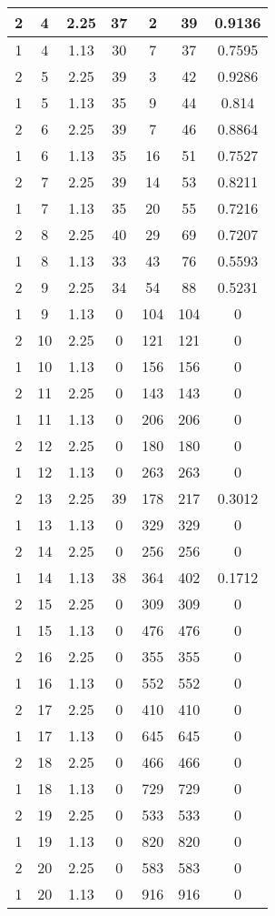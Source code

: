 \documentclass[letterpaper, 12pt]{article}
\begin{document}
\begin{longtable}{|c|c|c|c|c|c|c|}
\hline
2 & 4 & 2.25 & 37 & 2 & 39 & 0.9136 \\
\hline
1 & 4 & 1.13 & 30 & 7 & 37 & 0.7595 \\
\hline
2 & 5 & 2.25 & 39 & 3 & 42 & 0.9286 \\
\hline
1 & 5 & 1.13 & 35 & 9 & 44 & 0.814 \\
\hline
2 & 6 & 2.25 & 39 & 7 & 46 & 0.8864 \\
\hline
1 & 6 & 1.13 & 35 & 16 & 51 & 0.7527 \\
\hline
2 & 7 & 2.25 & 39 & 14 & 53 & 0.8211 \\
\hline
1 & 7 & 1.13 & 35 & 20 & 55 & 0.7216 \\
\hline
2 & 8 & 2.25 & 40 & 29 & 69 & 0.7207 \\
\hline
1 & 8 & 1.13 & 33 & 43 & 76 & 0.5593 \\
\hline
2 & 9 & 2.25 & 34 & 54 & 88 & 0.5231 \\
\hline
1 & 9 & 1.13 & 0 & 104 & 104 & 0 \\
\hline
2 & 10 & 2.25 & 0 & 121 & 121 & 0 \\
\hline
1 & 10 & 1.13 & 0 & 156 & 156 & 0 \\
\hline
2 & 11 & 2.25 & 0 & 143 & 143 & 0 \\
\hline
1 & 11 & 1.13 & 0 & 206 & 206 & 0 \\
\hline
2 & 12 & 2.25 & 0 & 180 & 180 & 0 \\
\hline
1 & 12 & 1.13 & 0 & 263 & 263 & 0 \\
\hline
2 & 13 & 2.25 & 39 & 178 & 217 & 0.3012 \\
\hline
1 & 13 & 1.13 & 0 & 329 & 329 & 0 \\
\hline
2 & 14 & 2.25 & 0 & 256 & 256 & 0 \\
\hline
1 & 14 & 1.13 & 38 & 364 & 402 & 0.1712 \\
\hline
2 & 15 & 2.25 & 0 & 309 & 309 & 0 \\
\hline
1 & 15 & 1.13 & 0 & 476 & 476 & 0 \\
\hline
2 & 16 & 2.25 & 0 & 355 & 355 & 0 \\
\hline
1 & 16 & 1.13 & 0 & 552 & 552 & 0 \\
\hline
2 & 17 & 2.25 & 0 & 410 & 410 & 0 \\
\hline
1 & 17 & 1.13 & 0 & 645 & 645 & 0 \\
\hline
2 & 18 & 2.25 & 0 & 466 & 466 & 0 \\
\hline
1 & 18 & 1.13 & 0 & 729 & 729 & 0 \\
\hline
2 & 19 & 2.25 & 0 & 533 & 533 & 0 \\
\hline
1 & 19 & 1.13 & 0 & 820 & 820 & 0 \\
\hline
2 & 20 & 2.25 & 0 & 583 & 583 & 0 \\
\hline
1 & 20 & 1.13 & 0 & 916 & 916 & 0 \\
\hline
\end{longtable}
\end{document}
